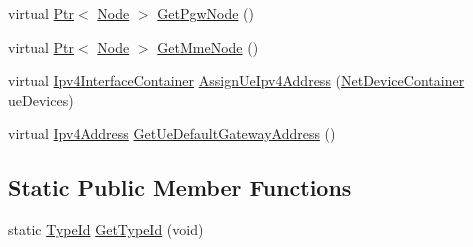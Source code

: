 \begin{DoxyCompactItemize}
\item 
virtual \hyperlink{classns3_1_1Ptr}{Ptr}$<$ \hyperlink{classns3_1_1Node}{Node} $>$ \hyperlink{classns3_1_1MmWavePointToPointEpcHelper_a586f072ee5b09376531ba605b3fed05f}{Get\+Pgw\+Node} ()
\item 
virtual \hyperlink{classns3_1_1Ptr}{Ptr}$<$ \hyperlink{classns3_1_1Node}{Node} $>$ \hyperlink{classns3_1_1MmWavePointToPointEpcHelper_ac48ea296195152ce8b02cd1936a5c822}{Get\+Mme\+Node} ()
\item 
virtual \hyperlink{classns3_1_1Ipv4InterfaceContainer}{Ipv4\+Interface\+Container} \hyperlink{classns3_1_1MmWavePointToPointEpcHelper_ad96757d4c63d33f683dce1b5d6bca3b9}{Assign\+Ue\+Ipv4\+Address} (\hyperlink{classns3_1_1NetDeviceContainer}{Net\+Device\+Container} ue\+Devices)
\item 
virtual \hyperlink{classns3_1_1Ipv4Address}{Ipv4\+Address} \hyperlink{classns3_1_1MmWavePointToPointEpcHelper_afefac14ad79ff059b052305013d2beb3}{Get\+Ue\+Default\+Gateway\+Address} ()
\end{DoxyCompactItemize}
\subsection*{Static Public Member Functions}
\begin{DoxyCompactItemize}
\item 
static \hyperlink{classns3_1_1TypeId}{Type\+Id} \hyperlink{classns3_1_1MmWavePointToPointEpcHelper_a64af53d3f39723480b1514e13216737c}{Get\+Type\+Id} (void)
\end{DoxyCompactItemize}

